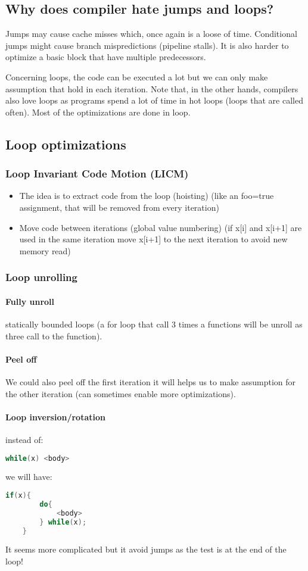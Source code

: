 \subsection{Why does compiler hate jumps and loops?}
Jumps may cause cache misses which, once again is a loose of time. Conditional
jumps might cause branch mispredictions (pipeline stalls). It is also harder to
optimize a basic block that have multiple predecessors.

Concerning loops, the code can be executed a lot but we can only make assumption
that hold in each iteration. Note that, in the other hands, compilers also love
loops as programs spend a lot of time in hot loops (loops that are called
often). Most of the optimizations are done in loop.

\subsection{Loop optimizations}
\subsubsection{Loop Invariant Code Motion (LICM)}
    \begin{itemize}
        \item The idea is to extract code from the loop (hoisting) (like an
        foo=true assignment, that will be removed from every iteration)
        \item Move code between iterations (global value numbering) (if x[i] and
        x[i+1] are used in the same iteration move x[i+1] to the next iteration
        to avoid new memory read)
    \end{itemize}
\subsubsection{Loop unrolling}
\paragraph{Fully unroll} statically bounded loops (a for loop that call 3 times a functions
will be unroll as three call to the function). 
\paragraph{Peel off}
We could also peel off the first iteration it will helps us to make assumption
for the other iteration (can sometimes enable more optimizations).
\paragraph{Loop inversion/rotation} instead of:
\begin{lstlisting}[language=Java]
    while(x) <body>
\end{lstlisting}
we will have:
\begin{lstlisting}[language=Java]
    if(x){
        do{
            <body>
        } while(x);
    }
\end{lstlisting}
It seems more complicated but it avoid jumps as the test is at the end of the loop!
